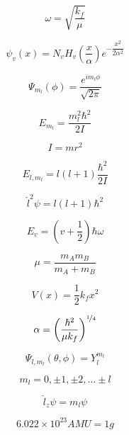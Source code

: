 \documentclass[12pt, letterpaper]{memoir}
\begin{document}
		\begin{minipage}{0.495\textwidth}
		
				
			\begin{equation*}
				\omega=\sqrt{\dfrac{k_f}{\mu}}
			\end{equation*}			
			
			\begin{equation*}
				\psi_v(x) = N_vH_v\left(\dfrac{x}{\alpha}\right)e^{-\dfrac{x^2}{2\alpha^2}}
			\end{equation*}
		
			\begin{equation*}
				\Psi_{m_l}(\phi)=\frac{e^{im_l\phi}}{\sqrt{2\pi}}
			\end{equation*}
			
			\begin{equation*}
				E_{m_l}=\frac{m_l^2\hbar^2}{2I}
			\end{equation*}
			
			\begin{equation*}
				I=mr^2
			\end{equation*}
		
			\begin{equation*}
				E_{l,m_l}=l(l+1)\dfrac{\hbar^2}{2I}
			\end{equation*}
			
			\begin{equation*}
				\hat{l}^2\psi=l(l+1)\hbar^2
			\end{equation*}				
		\end{minipage}
		\begin{minipage}{0.495\textwidth}	
		
			\begin{equation*}
				E_v = \left(v+\frac{1}{2}\right) \hbar\omega
			\end{equation*}
			
			\begin{equation*}
				\mu=\frac{m_Am_B}{m_A+m_B}
			\end{equation*}
			
			\begin{equation*}
				V(x)=\frac{1}{2}k_fx^2
			\end{equation*}
		
		\begin{equation*}
			\alpha = \left(\dfrac{\hbar^2}{\mu k_f}\right)^{\nicefrac{1}{4}}
		\end{equation*}		
			
			\begin{equation*}
				\Psi_{l,m_l}(\theta, \phi)=Y_l^{m_l}
			\end{equation*}
			
			\begin{equation*}
				m_l = 0, \pm1, \pm2, \ldots \pm l
			\end{equation*}
						
			\begin{equation*}
			\hat{l}_z\psi=m_l\psi
			\end{equation*}
			
			\begin{equation*}
				6.022\times10^{23}AMU=1g
			\end{equation*}
			
		\end{minipage}
\end{document}
